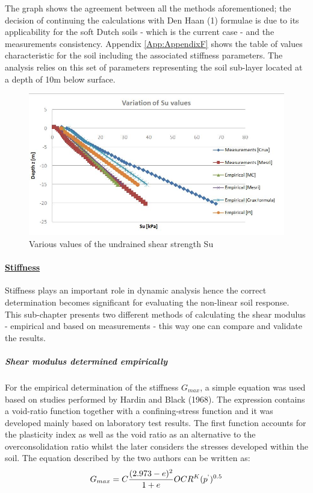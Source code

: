 \documentclass[10pt,a4paper]{report}
\begin{document}
The graph shows the agreement between all the methods aforementioned; the decision of continuing the calculations with Den Haan (1) formulae is due to its applicability for the soft Dutch soils - which is the current case - and the measurements consistency. Appendix \ref{App:AppendixF} shows the table of values characteristic for the soil including the associated stiffness parameters. The analysis relies on this set of parameters representing the soil sub-layer located at a depth of 10m below surface.

\begin{figure}[h!]
	\centering
	\includegraphics[width=0.7\linewidth]{"Su"}
	\caption{Various values of the undrained shear strength Su}
	\label{Su}
\end{figure}

\paragraph{\underline{Stiffness}}
Stiffness plays an important role in dynamic analysis hence the correct determination becomes significant for evaluating the non-linear soil response. This sub-chapter presents two different methods of calculating the shear modulus - empirical and based on measurements - this way one can compare and validate the results.

\subparagraph{Shear modulus determined empirically}
For the empirical determination of the stiffness $G_{max}$, a simple equation was used based on studies performed by Hardin and Black (1968). The expression contains a void-ratio function together with a confining-stress function and it was developed mainly based on laboratory test results. The first function accounts for the plasticity index as well as the void ratio as an alternative to the overconsolidation ratio whilst the later considers the stresses developed within the soil. The equation described by the two authors can be written as:
\begin{equation}
	G_{max}=C \frac{(2.973-e)^2}{1+e}OCR^K(p^`)^{0.5}
\end{equation}
\end{document}
